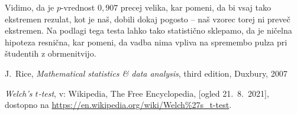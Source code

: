 \documentclass[a4paper,11pt]{article}
\begin{document}
Vidimo, da je $p$-vrednost $0,907$ precej velika, kar pomeni, da bi vsaj tako ekstremen rezulat, kot je naš, dobili dokaj pogosto -- naš vzorec torej ni preveč ekstremen. Na podlagi tega testa lahko tako statistično sklepamo, da je ničelna hipoteza resnična, kar pomeni, da vadba nima vpliva na spremembo pulza pri študentih z obrmenitvijo.

\begin{thebibliography}{99}

    J.~Rice, \emph{Mathematical statistics \& data analysis}, third edition, Duxbury, 2007

    \emph{Welch's $t$-test}, v: Wikipedia, The Free Encyclopedia, [ogled 21.~8.~2021], dostopno na \url{https://en.wikipedia.org/wiki/Welch%27s_t-test}.
    
\end{thebibliography}
\end{document}
